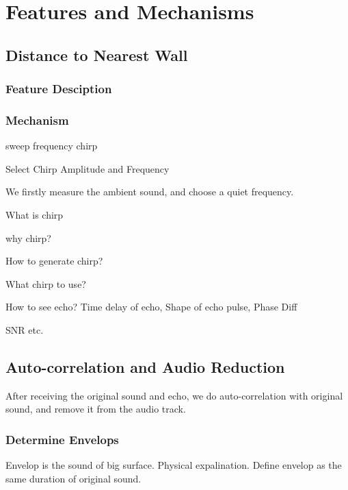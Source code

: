 \section{Features and Mechanisms}
\label{sec:mechanism}



\subsection{Distance to Nearest Wall}
\subsubsection{Feature Desciption}

\subsubsection{Mechanism}


sweep frequency chirp


Select Chirp Amplitude and Frequency

We firstly measure the ambient sound, and choose a quiet frequency.


What is chirp


why chirp?


How to generate chirp?


What chirp to use?


How to see echo? Time delay of echo, Shape of echo pulse, Phase Diff


SNR etc.



\subsection{Auto-correlation and Audio Reduction}

After receiving the original sound and echo, we do auto-correlation with original sound,
and remove it from the audio track.



\subsubsection{Determine Envelops}

Envelop is the sound of big surface. Physical expalination. 
Define envelop as the same duration of original sound.




